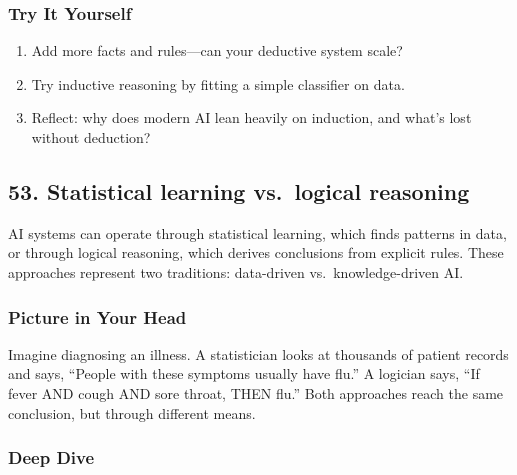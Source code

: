 \documentclass[
  letterpaper,
  DIV=11,
  numbers=noendperiod]{scrreprt}
\providecommand{\tightlist}{%
  \setlength{\itemsep}{0pt}\setlength{\parskip}{0pt}}
\begin{document}
\subsubsection{Try It Yourself}\label{try-it-yourself-51}

\begin{enumerate}
\def\labelenumi{\arabic{enumi}.}
\tightlist
\item
  Add more facts and rules---can your deductive system scale?
\item
  Try inductive reasoning by fitting a simple classifier on data.
\item
  Reflect: why does modern AI lean heavily on induction, and what's lost
  without deduction?
\end{enumerate}

\subsection{53. Statistical learning vs.~logical
reasoning}\label{statistical-learning-vs.-logical-reasoning}

AI systems can operate through statistical learning, which finds
patterns in data, or through logical reasoning, which derives
conclusions from explicit rules. These approaches represent two
traditions: data-driven vs.~knowledge-driven AI.

\subsubsection{Picture in Your Head}\label{picture-in-your-head-52}

Imagine diagnosing an illness. A statistician looks at thousands of
patient records and says, ``People with these symptoms usually have
flu.'' A logician says, ``If fever AND cough AND sore throat, THEN
flu.'' Both approaches reach the same conclusion, but through different
means.

\subsubsection{Deep Dive}\label{deep-dive-52}
\end{document}
